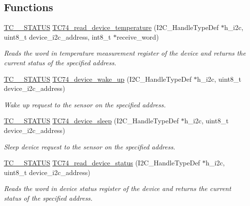 \subsection*{Functions}
\begin{DoxyCompactItemize}
\item 
\hyperlink{group__tc74__device__driver_ga5efc26e94b9e9e19bd364c2d8b57f00f}{T\-C\-\_\-\_\-\-S\-T\-A\-T\-U\-S} \hyperlink{group__tc74__device__driver_gaaad8e710b5b20ff439c20c3e6a1899df}{T\-C74\-\_\-read\-\_\-device\-\_\-temperature} (I2\-C\-\_\-\-Handle\-Type\-Def $\ast$h\-\_\-i2c, uint8\-\_\-t device\-\_\-i2c\-\_\-address, int8\-\_\-t $\ast$receive\-\_\-word)
\begin{DoxyCompactList}\small\item\em Reads the word in temperature measurement register of the device and returns the current status of the specified address. \end{DoxyCompactList}\item 
\hyperlink{group__tc74__device__driver_ga5efc26e94b9e9e19bd364c2d8b57f00f}{T\-C\-\_\-\_\-\-S\-T\-A\-T\-U\-S} \hyperlink{group__tc74__device__driver_gac7c41cdd9ddc545f8ba0cf9502211825}{T\-C74\-\_\-device\-\_\-wake\-\_\-up} (I2\-C\-\_\-\-Handle\-Type\-Def $\ast$h\-\_\-i2c, uint8\-\_\-t device\-\_\-i2c\-\_\-address)
\begin{DoxyCompactList}\small\item\em Wake up request to the sensor on the specified address. \end{DoxyCompactList}\item 
\hyperlink{group__tc74__device__driver_ga5efc26e94b9e9e19bd364c2d8b57f00f}{T\-C\-\_\-\_\-\-S\-T\-A\-T\-U\-S} \hyperlink{group__tc74__device__driver_ga3763067025ca01685ccae3b7c2d8bc8d}{T\-C74\-\_\-device\-\_\-sleep} (I2\-C\-\_\-\-Handle\-Type\-Def $\ast$h\-\_\-i2c, uint8\-\_\-t device\-\_\-i2c\-\_\-address)
\begin{DoxyCompactList}\small\item\em Sleep device request to the sensor on the specified address. \end{DoxyCompactList}\item 
\hyperlink{group__tc74__device__driver_ga5efc26e94b9e9e19bd364c2d8b57f00f}{T\-C\-\_\-\_\-\-S\-T\-A\-T\-U\-S} \hyperlink{group__tc74__device__driver_ga03276e6c60fb80c35af1bd788a4dabbd}{T\-C74\-\_\-read\-\_\-device\-\_\-status} (I2\-C\-\_\-\-Handle\-Type\-Def $\ast$h\-\_\-i2c, uint8\-\_\-t device\-\_\-i2c\-\_\-address)
\begin{DoxyCompactList}\small\item\em Reads the word in device status register of the device and returns the current status of the specified address. \end{DoxyCompactList}\end{DoxyCompactItemize}



